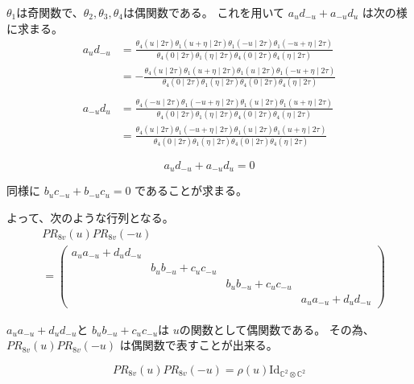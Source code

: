 \documentclass[12pt,b5paper]{ltjsarticle}
\begin{document}
$\theta_{1}$は奇関数で、$\theta_{2},\theta_{3},\theta_{4}$は偶関数である。
これを用いて
$a_{u}d_{-u}+a_{-u}d_{u}$%
は次の様に求まる。
\begin{align}
 a_{u}d_{-u}
  &=\frac{\theta_{4}(u\mid 2\tau) \theta_{1}(u+\eta\mid 2\tau)
     \theta_{1}(-u\mid 2\tau) \theta_{1}(-u+\eta\mid 2\tau)}
   {\theta_{4}(0\mid 2\tau) \theta_{1}(\eta\mid 2\tau)
     \theta_{4}(0\mid 2\tau) \theta_{4}(\eta\mid 2\tau)}\\
 &=-\frac{\theta_{4}(u\mid 2\tau) \theta_{1}(u+\eta\mid 2\tau)
     \theta_{1}(u\mid 2\tau) \theta_{1}(-u+\eta\mid 2\tau)}
   {\theta_{4}(0\mid 2\tau) \theta_{1}(\eta\mid 2\tau)
     \theta_{4}(0\mid 2\tau) \theta_{4}(\eta\mid 2\tau)}\\
\\
%
a_{-u}d_{u}
  &=\frac{\theta_{4}(-u\mid 2\tau) \theta_{1}(-u+\eta\mid 2\tau)
     \theta_{1}(u\mid 2\tau) \theta_{1}(u+\eta\mid 2\tau)}
   {\theta_{4}(0\mid 2\tau) \theta_{1}(\eta\mid 2\tau)
 \theta_{4}(0\mid 2\tau) \theta_{4}(\eta\mid 2\tau)}\\
 &= \frac{\theta_{4}(u\mid 2\tau) \theta_{1}(-u+\eta\mid 2\tau)
     \theta_{1}(u\mid 2\tau) \theta_{1}(u+\eta\mid 2\tau)}
   {\theta_{4}(0\mid 2\tau) \theta_{1}(\eta\mid 2\tau)
 \theta_{4}(0\mid 2\tau) \theta_{4}(\eta\mid 2\tau)}
\end{align}

\begin{equation}
 a_{u}d_{-u} +a_{-u}d_{u} =0
\end{equation}

同様に
$b_{u}c_{-u}+b_{-u}c_{u} =0$
であることが求まる。


よって、次のような行列となる。
\begin{align}
& P R_{8v}(u) P R_{8v}(-u) \\
 &=
 \begin{pmatrix}
 a_{u}a_{-u}+d_{u}d_{-u} & & & \\
 & b_{u}b_{-u}+c_{u}c_{-u} & & \\
 &  & b_{u}b_{-u}+c_{u}c_{-u} & \\
  & & & a_{u}a_{-u}+d_{u}d_{-u}
 \end{pmatrix}
\end{align}

$a_{u}a_{-u}+d_{u}d_{-u}$と
$b_{u}b_{-u}+c_{u}c_{-u}$は
$u$の関数として偶関数である。
その為、
$P R_{8v}(u) P R_{8v}(-u)$
は偶関数で表すことが出来る。

\begin{equation}
 P R_{8v}(u) P R_{8v}(-u)
  =\rho(u) \mathrm{Id}_{\mathbb{C}^{2}\otimes \mathbb{C}^{2}}
\end{equation}
\end{document}
